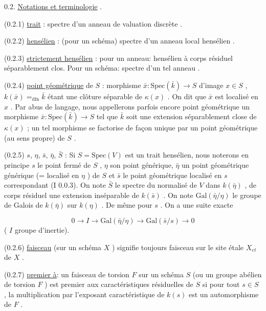 0.2. \underline{Notations et terminologie} .

(0.2.1) \underline{trait} : spectre d'un anneau de valuation discrète .

(0.2.2) \underline{hensélien} : (pour un schéma) spectre d'un anneau local hensélien .

(0.2.3) \underline{strictement hensélien} : pour un anneau: hensélien à corps résiduel séparablement clos. Pour un schéma: spectre d'un tel anneau .

(0.2.4) \underline{point géométrique} de $S$ : morphisme $\bar{x} : \mathrm{Spec}(\bar{k}) \to S$ d'image $x \in S$ , $k(\bar{x}) =_{\mathrm{dfn}} \bar{k}$ étant une clôture séparable de $\kappa(x)$ . On dit que $\bar{x}$ est localisé en $x$ . Par abus de langage, nous appellerons parfois encore point géométrique un morphisme $\bar{x} : \mathrm{Spec}(\bar{k}) \to S$ tel que $\bar{k}$ soit une extension séparablement close de $\kappa(x)$ ; un tel morphisme se factorise de façon unique par un point géométrique (au sens propre) de $S$ .

(0.2.5) $s$, $\eta$, $\bar{s}$, $\bar{\eta}$, $\bar{S}$ : Si $S = \mathrm{Spec}(V)$ est un trait hensélien, nous noterons en principe $s$ le point fermé de $S$ , $\eta$ son point générique, $\bar{\eta}$ un point géométrique générique (= localisé en $\eta$ ) de $S$ et $\bar{s}$ le point géométrique localisé en $s$ correspondant (I 0.0.3). On note $\bar{S}$ le spectre du normalisé de $V$ dans $k(\bar{\eta})$ , de corps résiduel une extension inséparable de $k(\bar{s})$ . On note $\mathrm{Gal}(\bar{\eta}/\eta )$ le groupe de Galois de $k(\bar{\eta})$ sur $k(\eta)$ . De même pour $s$ . On a une suite exacte

\begin{equation*}
0 \longrightarrow I \longrightarrow \mathrm{Gal}(\bar{\eta}/\eta) \longrightarrow \mathrm{Gal}(\bar{s}/s) \longrightarrow 0
\end{equation*}
( $I$ groupe d'inertie).

(0.2.6) \underline{faisceau} (sur un schéma $X$ ) signifie toujours faisceau sur le site étale $X_{et}$ de $X$ .

(0.2.7) \underline{premier à}: un faisceau de torsion $F$ sur un schéma $S$ (ou un groupe abélien de torsion $F$ ) est premier aux caractéristiques résiduelles de $S$ si pour tout $s \in S$ , la multiplication par l'exposant caractéristique de $k(s)$ est un automorphisme de $F$ .




